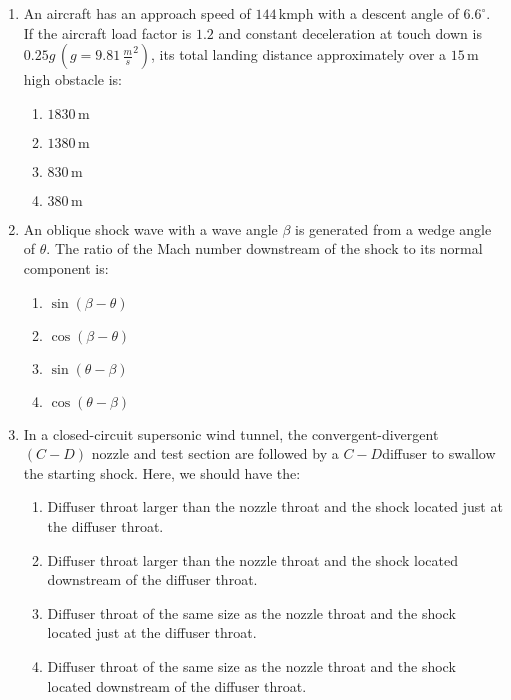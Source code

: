 \documentclass[journal]{IEEEtran}
\newcommand{\brak}[1]{\left( #1 \right)}
\begin{document}
\begin{enumerate}
    \item An aircraft has an approach speed of $144 \, \text{kmph}$ with a descent angle of $ 6.6^\circ $. If the aircraft load factor is $1.2$ and constant deceleration at touch down is $0.25g \, \brak{g = 9.81 \, \frac{m}{s}^2} $, its total landing distance approximately over a $15 \, \text{m}$ high obstacle is:
    \begin{enumerate}
        \item $1830 \, \text{m}$
        \item $1380 \, \text{m}$
        \item $830 \, \text{m}$
        \item $380 \, \text{m}$
    \end{enumerate}

    \item An oblique shock wave with a wave angle $ \beta $ is generated from a wedge angle of $ \theta $. The ratio of the Mach number downstream of the shock to its normal component is:
    \begin{enumerate}
        \item $ \sin\brak{\beta - \theta} $
        \item $ \cos\brak{\beta - \theta} $
        \item $ \sin\brak{\theta - \beta} $
        \item $ \cos\brak{\theta - \beta} $
    \end{enumerate}

    \item In a closed-circuit supersonic wind tunnel, the convergent-divergent $\brak{C-D}$ nozzle and test section are followed by a $C-D$diffuser to swallow the starting shock. Here, we should have the:
    \begin{enumerate}
        \item Diffuser throat larger than the nozzle throat and the shock located just at the diffuser throat.
        \item Diffuser throat larger than the nozzle throat and the shock located downstream of the diffuser throat.
        \item Diffuser throat of the same size as the nozzle throat and the shock located just at the diffuser throat.
        \item Diffuser throat of the same size as the nozzle throat and the shock located downstream of the diffuser throat.
    \end{enumerate}


\end{enumerate}
\end{document}
